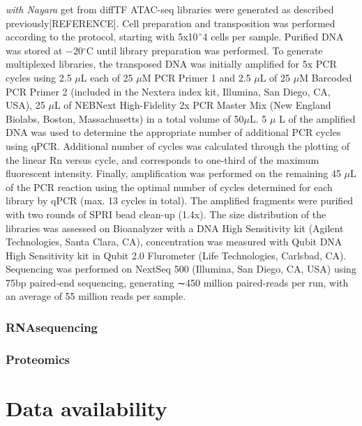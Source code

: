 \documentclass[11pt, a4paper, twosided]{book}
\begin{document}
\emph{with Nayara} get from diffTF
ATAC-seq libraries were generated as described previously{[}REFERENCE{]}. Cell preparation and transposition was performed according to the protocol, starting with 5x10ˆ4 cells per sample. Purified DNA was stored at −20\(^\circ\)C until library preparation was performed. To generate multiplexed libraries, the transposed DNA was initially amplified for 5x PCR cycles using 2.5 \(\mu\)L each of 25 \(\mu\)M PCR Primer 1 and 2.5 \(\mu\)L of 25 \(\mu\)M Barcoded PCR Primer 2 (included in the Nextera index kit, Illumina, San Diego, CA, USA), 25 \(\mu\)L of NEBNext High-Fidelity 2x PCR Master Mix (New England Biolabs, Boston, Massachusetts) in a total volume of 50\(\mu\)L. 5 \(\mu\) L of the amplified DNA was used to determine the appropriate number of additional PCR cycles using qPCR. Additional number of cycles was calculated through the plotting of the linear Rn versus cycle, and corresponds to one-third of the maximum fluorescent intensity. Finally, amplification was performed on the remaining 45 \(\mu\)L of the PCR reaction using the optimal number of cycles determined for each library by qPCR (max. 13 cycles in total). The amplified fragments were purified with two rounds of SPRI bead clean-up (1.4x). The size distribution of the libraries was assessed on Bioanalyzer with a DNA High Sensitivity kit (Agilent Technologies, Santa Clara, CA), concentration was measured with Qubit DNA High Sensitivity kit in Qubit 2.0 Flurometer (Life Technologies, Carlsbad, CA). Sequencing was performed on NextSeq 500 (Illumina, San Diego, CA, USA) using 75bp paired-end sequencing, generating ∼450 million paired-reads per run, with an average of 55 million reads per sample.

\hypertarget{rnasequencing}{%
\subsubsection{RNAsequencing}\label{rnasequencing}}

\hypertarget{proteomics}{%
\subsubsection{Proteomics}\label{proteomics}}

\hypertarget{data-availability}{%
\section{Data availability}\label{data-availability}}
\end{document}
